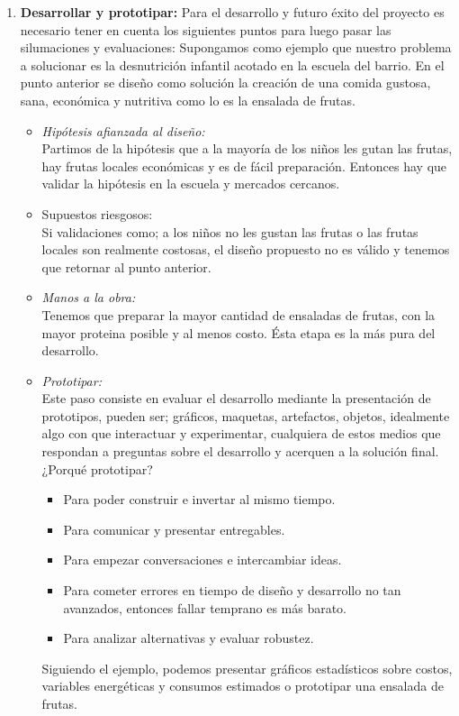 \begin{enumerate}
 \item \textbf{Desarrollar y prototipar:}
 Para el desarrollo y futuro \'exito del proyecto es necesario tener en cuenta los siguientes puntos para luego pasar las silumaciones y evaluaciones:
 Supongamos como ejemplo que nuestro problema a solucionar es la desnutrici\'on infantil acotado en la escuela del barrio. En el punto anterior se dise\~no
 como soluci\'on la creaci\'on de una comida gustosa, sana, econ\'omica y nutritiva como lo es la ensalada de frutas.
 \begin{itemize}
  \item \textit{Hip\'otesis afianzada al dise\~no:}\\
  Partimos de la hip\'otesis que a la mayor\'ia de los ni\~nos les gutan las frutas, hay frutas locales econ\'omicas y es de f\'acil preparaci\'on. Entonces 
  hay que validar la hip\'otesis en la escuela y mercados cercanos.
  \item Supuestos riesgosos:\\
  Si validaciones como; a los ni\~nos no les gustan las frutas o las frutas locales son realmente costosas, el dise\~no propuesto no es v\'alido y tenemos que
  retornar al punto anterior.
  \item \textit{Manos a la obra:}\\
  Tenemos que preparar la mayor cantidad de ensaladas de frutas, con la mayor proteina posible y al menos costo. \'Esta etapa es la m\'as pura del desarrollo.
  \item \textit{Prototipar:}\\
  Este paso consiste en evaluar el desarrollo mediante la presentaci\'on de prototipos, pueden ser; gr\'aficos, maquetas, artefactos, objetos, idealmente algo 
  con que interactuar y experimentar, cualquiera de estos medios que respondan a preguntas sobre el desarrollo y acerquen a la soluci\'on final.\\
  ¿Porqu\'e prototipar? 
  \begin{itemize}
   \item Para poder construir e invertar al mismo tiempo.
   \item Para comunicar y presentar entregables.
   \item Para empezar conversaciones e intercambiar ideas.
   \item Para cometer errores en tiempo de dise\~no y desarrollo no tan avanzados, entonces fallar temprano es m\'as barato.
   \item Para analizar alternativas y evaluar robustez.
  \end{itemize}
  Siguiendo el ejemplo, podemos presentar gr\'aficos estad\'isticos sobre costos, variables energ\'eticas y consumos estimados o prototipar una ensalada de 
  frutas.
 \end{itemize}
 

\end{enumerate}
